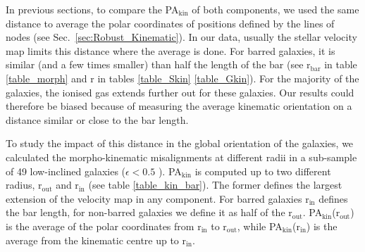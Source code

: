 \documentclass[longauth,traditabstract]{aa}
\begin{document}
In previous sections, to compare the PA$_{\mathrm{kin}}$ of both components, we used the same distance to average the polar coordinates of positions defined by the lines of nodes (see Sec.~\ref{sec:Robust_Kinematic}). In our data, usually
the stellar velocity map limits this distance where the average is done. For barred galaxies, it is similar (and a few times smaller) than half the length of the bar (see r$\mathrm{_{bar}}$ in table \ref{table_morph}  and r in tables \ref{table_Skin} \ref{table_Gkin}).
For the majority of the galaxies, the ionised gas extends further out for these galaxies. Our results could therefore be biased because of measuring the average kinematic orientation on a distance similar or close to the bar length.

To study the impact of this distance in the global orientation of the
galaxies, we calculated the morpho-kinematic misalignments at different radii in
a sub-sample of 49 low-inclined galaxies ($\epsilon<0.5$ ).  PA$_{\mathrm{kin}}$ is computed 
up to two different radius, r$_{\mathrm{out}}$ and r$_{\mathrm{in}}$ (see table
\ref{table_kin_bar}). The former defines the largest extension of the velocity
map in any component. For barred galaxies r$_{\mathrm{in}}$ defines the bar
length, for non-barred galaxies we define it as half of the r$_{\mathrm{out}}$.
PA$_{\mathrm{kin}}$(r$_{\mathrm{out}}$)  is the average of the polar coordinates
from  r$_{\mathrm{in}}$ to r$_{\mathrm{out}}$, while
PA$_{\mathrm{kin}}$(r$_{\mathrm{in}}$) is the average from the kinematic centre
up to r$_{\mathrm{in}}$.
\end{document}
